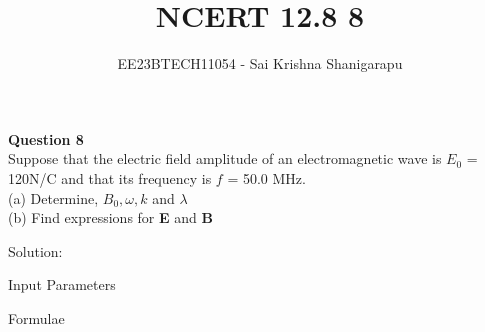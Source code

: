 \documentclass[journal,12pt,twocolumn]{IEEEtran}
\theoremstyle{remark}
\begin{document}

\vspace{3cm}

\title{NCERT 12.8 8}
\author{EE23BTECH11054 - Sai Krishna Shanigarapu%
}
\maketitle
\newpage
\bigskip

\begin{flushleft}
\textbf{Question 8}\\
Suppose that the electric field amplitude of an electromagnetic wave is $E_0$ = 120N/C and that its frequency is $f$ = 50.0 MHz.\\
(a) Determine, $B_0, \omega, k$ and $\lambda$\\
(b) Find expressions for \textbf{E} and \textbf{B}\\
\end{flushleft}

\bigskip

\begin{flushleft}
Solution:
\end{flushleft}

\begin{center}
    \begin{table}[ht]
        \caption{Input Parameters}
        
        \label{tab:table1.12.8.8}
    \end{table}
\end{center}

\begin{flushleft}
    \begin{table}[ht]
       \caption{Formulae}
       
       \label{tab:table2.12.8.8}
    \end{table}
\bigskip
\end{flushleft}

\bigskip
%
%
%
%
\end{document}
